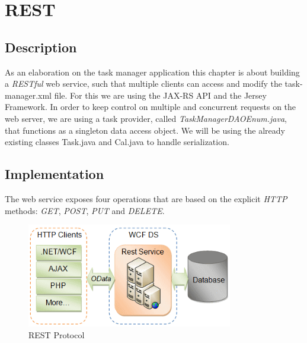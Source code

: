 

\section*{REST}

\subsection*{Description}

As an elaboration on the task manager application this chapter is about building a \textit{RESTful} web service, such that multiple clients can access and modify the task-manager.xml file. 
For this we are using the JAX-RS API and the Jersey Framework.
In order to keep control on multiple and concurrent requests on the web server, we are using a task provider, called \textit{TaskManagerDAOEnum.java}, that functions as a singleton data access object. We will be using the already existing classes Task.java and Cal.java to handle serialization.

\subsection*{Implementation}

The web service exposes four operations that are based on the explicit \textit{HTTP} methods: \textit{GET}, \textit{POST}, \textit{PUT} and \textit{DELETE}. 

\begin{figure}[ht!]
	\centering
		\includegraphics[width=90mm]{graphics/figure1.gif}
		\caption{REST Protocol}
		\label{overflow}
\end{figure}

